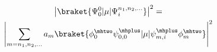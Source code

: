 %
%

\begin{multline}
   \left| \braket{ \Psi_{0}^{0} |  \mu | \Psi_{i}^{n_1, n_2, ...} }  \right|^2 = \\
    	\left| \sum_{m=n_1, n_2, ...} a_m \braket{ \phi^{\mhtwo}_{0}\psi^{\mhplus}_{0, 0} | \mu | \psi^{\mhplus}_{m, i}\phi^{\mhtwo}_{m} }  \right|^2
\label{eq:couple_spec_osc}
\end{multline}

%
